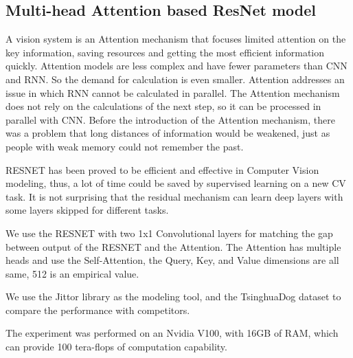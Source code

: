 \documentclass[10pt,twocolumn,letterpaper]{article}
\begin{document}
\subsection{Multi-head Attention based ResNet model}

A vision system is an Attention mechanism that focuses limited attention on the key information, saving resources and getting the most efficient information quickly.
Attention models are less complex and have fewer parameters than CNN and RNN. So the demand for calculation is even smaller.
Attention addresses an issue in which RNN cannot be calculated in parallel.
The Attention mechanism does not rely on the calculations of the next step, so it can be processed in parallel with CNN.
Before the introduction of the Attention mechanism, there was a problem that long distances of information would be weakened,
just as people with weak memory could not remember the past.

\par RESNET has been proved to be efficient and effective in Computer Vision modeling, thus, a lot of time could be saved by supervised learning on a new CV task.
It is not surprising that the residual mechanism can learn deep layers with some layers skipped for different tasks.

\par We use the RESNET with two 1x1 Convolutional layers for matching the gap between output of the RESNET and the Attention.
The Attention has multiple heads and use the Self-Attention, the Query, Key, and Value dimensions are all same, 512 is an empirical value.

\par We use the Jittor\cite{hu2020jittor} library as the modeling tool, and the TsinghuaDog\cite{Zou2020ThuDogs} dataset to compare the performance with competitors.

\par The experiment was performed on an Nvidia V100, with 16GB of RAM,
which can provide 100 tera-flops of computation capability.
\end{document}
